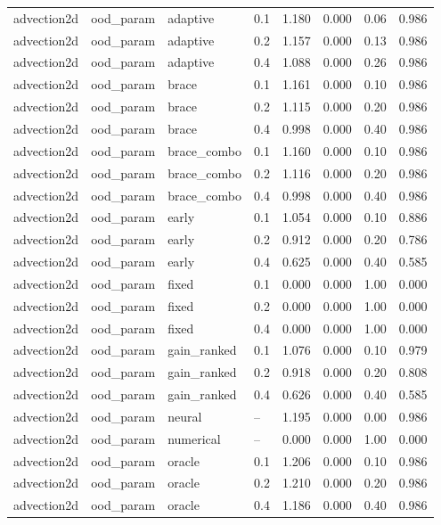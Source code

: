 \begin{tabular}{llllrrrr}
\midrule
advection2d & ood\_param & adaptive & 0.1 & 1.180 & 0.000 & 0.06 & 0.986 \\
advection2d & ood\_param & adaptive & 0.2 & 1.157 & 0.000 & 0.13 & 0.986 \\
advection2d & ood\_param & adaptive & 0.4 & 1.088 & 0.000 & 0.26 & 0.986 \\
advection2d & ood\_param & brace & 0.1 & 1.161 & 0.000 & 0.10 & 0.986 \\
advection2d & ood\_param & brace & 0.2 & 1.115 & 0.000 & 0.20 & 0.986 \\
advection2d & ood\_param & brace & 0.4 & 0.998 & 0.000 & 0.40 & 0.986 \\
advection2d & ood\_param & brace\_combo & 0.1 & 1.160 & 0.000 & 0.10 & 0.986 \\
advection2d & ood\_param & brace\_combo & 0.2 & 1.116 & 0.000 & 0.20 & 0.986 \\
advection2d & ood\_param & brace\_combo & 0.4 & 0.998 & 0.000 & 0.40 & 0.986 \\
advection2d & ood\_param & early & 0.1 & 1.054 & 0.000 & 0.10 & 0.886 \\
advection2d & ood\_param & early & 0.2 & 0.912 & 0.000 & 0.20 & 0.786 \\
advection2d & ood\_param & early & 0.4 & 0.625 & 0.000 & 0.40 & 0.585 \\
advection2d & ood\_param & fixed & 0.1 & 0.000 & 0.000 & 1.00 & 0.000 \\
advection2d & ood\_param & fixed & 0.2 & 0.000 & 0.000 & 1.00 & 0.000 \\
advection2d & ood\_param & fixed & 0.4 & 0.000 & 0.000 & 1.00 & 0.000 \\
advection2d & ood\_param & gain\_ranked & 0.1 & 1.076 & 0.000 & 0.10 & 0.979 \\
advection2d & ood\_param & gain\_ranked & 0.2 & 0.918 & 0.000 & 0.20 & 0.808 \\
advection2d & ood\_param & gain\_ranked & 0.4 & 0.626 & 0.000 & 0.40 & 0.585 \\
advection2d & ood\_param & neural & -- & 1.195 & 0.000 & 0.00 & 0.986 \\
advection2d & ood\_param & numerical & -- & 0.000 & 0.000 & 1.00 & 0.000 \\
advection2d & ood\_param & oracle & 0.1 & 1.206 & 0.000 & 0.10 & 0.986 \\
advection2d & ood\_param & oracle & 0.2 & 1.210 & 0.000 & 0.20 & 0.986 \\
advection2d & ood\_param & oracle & 0.4 & 1.186 & 0.000 & 0.40 & 0.986 \\

\end{tabular}
